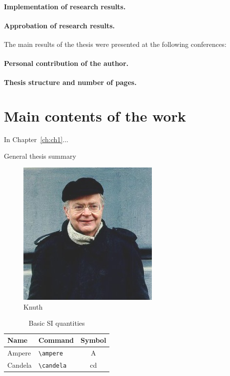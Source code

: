 \paragraph*{Implementation of research results.}
\paragraph*{Approbation of research results.}
The main results of the thesis were presented at the following conferences:
\printConferenceEN
\paragraph*{Personal contribution of the author.}
\paragraph*{Thesis structure and number of pages.}

\newpage
\section*{Main contents of the work}

In Chapter~\ref{ch:ch1}...
\begin{center}
	General thesis summary
\end{center}
\begin{figure}
	\centering
	\includegraphics[width=0.4\linewidth]{images/knuth}
	\caption{Knuth}
\end{figure}
\begin{table}
	\centering
	\captionsetup{justification=centering} %
	\caption{Basic SI quantities}%
	\begin{tabular}{llc}
		\toprule
		Name 	& 	Command 	& 	Symbol         \\
		\midrule
		Ampere     & \verb|\ampere| & \si{\ampere}   \\
		Candela   & \verb|\candela| & \si{\candela}  \\
		\bottomrule
	\end{tabular}
\end{table}


